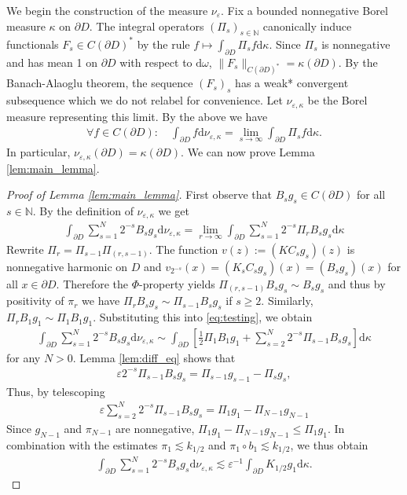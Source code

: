\documentclass[a4paper,12pt]{article}
\theoremstyle{definition}
\theoremstyle{definition}
\begin{document}
		We begin the construction of the measure $\nu_{\varepsilon}$. Fix a bounded nonnegative Borel measure $\kappa$ on $\partial D$. The integral operators $(\Pi_s)_{s\in\mathbb N}$ canonically induce functionals $F_s\in C(\partial D)^*$ by the rule $f\mapsto \int_{\partial D}\Pi_sf\mathrm d\kappa$. Since $\Pi_s$ is nonnegative and has mean 1 on $\partial D$ with respect to $\mathrm d\omega$, $\|F_s\|_{C(\partial D)^*}=\kappa(\partial D)$. By the Banach-Alaoglu theorem, the sequence $(F_s)_s$ has a weak* convergent subsequence which we do not relabel for convenience. Let $\nu_{\varepsilon,\kappa}$ be the Borel measure representing this limit. By the above we have 
		\begin{align*}%
			\forall f\in C({\partial D}):\quad\int_{\partial D}f\mathrm{d}\nu_{\varepsilon,\kappa}= \lim_{s\rightarrow\infty}\int_{\partial D}\Pi_{s}f\mathrm{d}\kappa.
		\end{align*}
		In particular, $\nu_{\varepsilon,\kappa}(\partial D)=\kappa(\partial D)$. We can now prove Lemma \ref{lem:main_lemma}.
		\begin{proof}[Proof of Lemma \ref{lem:main_lemma}]
			First observe that $B_sg_s\in C({\partial D})$ for all $s\in\mathbb N$. By the definition of $\nu_{\varepsilon,\kappa}$ we get 
			\begin{align}\label{eq:testing}
				\int_{\partial D}\sum_{s=1}^{N}2^{-s}B_sg_s\mathrm{d}\nu_{\varepsilon,\kappa} = \lim_{r\rightarrow\infty}\int_{\partial D}\sum_{s=1}^{N}2^{-s} \Pi_{r}B_sg_s\mathrm{d}\kappa
			\end{align}
			Rewrite $\Pi_r=\Pi_{s-1}\Pi_{(r,s-1)}$. The function $v(z):=(KC_sg_s)(z)$ is nonnegative harmonic on $D$ and $v_{2^{-s}}(x)=( K_sC_sg_s)(x)=(B_sg_s)(x)$ for all $x\in\partial D$. Therefore the $\Phi$-property yields $\Pi_{(r,s-1)}B_sg_s\sim B_sg_s$ and thus by positivity of $\pi_r$ we have $\Pi_{r}B_sg_s\sim \Pi_{s-1}B_sg_s$ if $s\geq2$. Similarly, $\Pi_rB_1g_1\sim\Pi_1B_1g_1$. Substituting this into \eqref{eq:testing}, we obtain
			\begin{align*}
				\int_{\partial D}\sum_{s=1}^{N}2^{-s}B_sg_s\mathrm{d}\nu_{\varepsilon,\kappa}\sim \int_{\partial D}\left[\frac{1}{2}\Pi_1B_1g_1+\sum_{s=2}^{N}2^{-s} \Pi_{s-1}B_sg_s\right]\mathrm{d}\kappa
			\end{align*}
			for any $N>0$. Lemma \ref{lem:diff_eq} shows that 
			\begin{align*}
				\varepsilon2^{-s}\Pi_{s-1}B_sg_s=\Pi_{s-1}g_{s-1}-\Pi_{s} g_s,
			\end{align*}
			Thus, by telescoping 
			\begin{align*}
				\varepsilon\sum_{s=2}^{N}2^{-s} \Pi_{s-1}B_sg_s=\Pi_1g_1-\Pi_{N-1}g_{N-1}
			\end{align*}
			Since $g_{N-1}$ and $\pi_{N-1}$ are nonnegative, $\Pi_{1}g_1-\Pi_{N-1}g_{N-1}\leq\Pi_1g_1$. In combination with the estimates $\pi_1\lesssim k_{1/2}$ and $\pi_1\circ b_1\lesssim k_{1/2}$, we thus obtain
			\begin{align*}
				\int_{\partial D}\sum_{s=1}^{N}2^{-s}B_sg_s\mathrm{d}\nu_{\varepsilon,\kappa}\lesssim\varepsilon^{-1} \int_{\partial D}K_{1/2}g_1\mathrm{d}\kappa.
			\end{align*}
		\end{proof}
		
\end{document}

